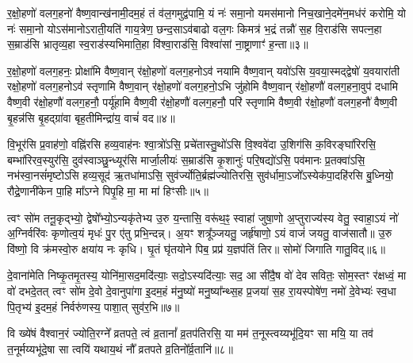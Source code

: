 {\anuvakamend[{द्वेष॑ इ॒मा अ॒ष्टाद॑श च॥१॥}]}

र॒क्षो॒हणो॑ वलग॒हनो॑ वैष्ण॒वान्ख॑नामी॒दम॒हं तं व॑ल॒गमुद्व॑पामि॒ यं नः॑ समा॒नो यमस॑मानो निच॒खाने॒दमे॑न॒मध॑रं करोमि॒ यो नः॑ समा॒नो यो\-ऽस॑मानो\-ऽराती॒यति॑ गाय॒त्रेण॒ छन्द॒सा\-ऽव॑बाढो वल॒गः किमत्र॑ भ॒द्रं तन्नौ॑ स॒ह वि॒राड॑सि सपत्न॒हा स॒म्राड॑सि भ्रातृव्य॒हा स्व॒राड॑स्यभिमाति॒हा वि॑श्वा॒राड॑सि॒ विश्वा॑सां ना॒ष्ट्राणाꣳ॑ ह॒न्ता॥३॥

र॒क्षो॒हणो॑ वलग॒हनः॒ प्रोक्षा॑मि वैष्ण॒वान् र॑क्षो॒हणो॑ वलग॒हनो\-ऽव॑ नयामि वैष्ण॒वान् यवो॑\-ऽसि य॒वया॒स्मद्द्वेषो॑ य॒वयारा॑ती रक्षो॒हणो॑ वलग॒हनो\-ऽव॑ स्तृणामि वैष्ण॒वान् र॑क्षो॒हणो॑ वलग॒हनो॒\-ऽभि जु॑होमि वैष्ण॒वान् र॑क्षो॒हणौ॑ वलग॒हना॒वुप॑ दधामि वैष्ण॒वी र॑क्षो॒हणौ॑ वलग॒हनौ॒ पर्यू॑हामि वैष्ण॒वी र॑क्षो॒हणौ॑ वलग॒हनौ॒ परि॑ स्तृणामि वैष्ण॒वी र॑क्षो॒हणौ॑ वलग॒हनौ॑ वैष्ण॒वी बृ॒हन्न॑सि बृ॒हद्ग्रा॑वा बृह॒तीमिन्द्रा॑य॒ वाचं॑ वद॥४॥

{\anuvakamend[{ह॒न्तेन्द्रा॑य॒ द्वे च॑॥२॥}]}

वि॒भूर॑सि प्र॒वाह॑णो॒ वह्नि॑रसि हव्य॒वाह॑नः श्वा॒त्रो॑\-ऽसि॒ प्रचे॑तास्तु॒थो॑\-ऽसि वि॒श्ववे॑दा उ॒शिग॑सि क॒विरङ्घा॑रिरसि॒ बम्भा॑रिरव॒स्युर॑सि॒ दुव॑स्वाञ्छु॒न्ध्यूर॑सि मार्जा॒लीयः॑ स॒म्राड॑सि कृ॒शानुः॑ परि॒षद्यो॑\-ऽसि॒ पव॑मानः प्र॒तक्वा॑\-ऽसि॒ नभ॑स्वा॒नसं॑मृष्टो\-ऽसि हव्य॒सूद॑ ऋ॒तधा॑मा\-ऽसि॒ सुव॑र्ज्योति॒र्ब्रह्म॑ज्योतिरसि॒ सुव॑र्धामा॒\-ऽजो᳚\-ऽस्येक॑पा॒दहि॑रसि बु॒ध्नियो॒ रौद्रे॒णानी॑केन पा॒हि मा᳚\-ऽग्ने पिपृ॒हि मा॒ मा मा॑ हिꣳसीः॥५॥

{\anuvakamend[{अनी॑केना॒ष्टौ च॑॥३॥}]}

त्वꣳ सो॑म तनू॒कृद्भ्यो॒ द्वेषो᳚भ्यो॒\-ऽन्यकृ॑तेभ्य उ॒रु य॒न्तासि॒ वरू॑थ॒ꣴ॒ स्वाहा॑ जुषा॒णो अ॒प्तुराज्य॑स्य वेतु॒ स्वाहा॒\-ऽयं नो॑ अ॒ग्निर्वरि॑वः कृणोत्व॒यं मृधः॑ पु॒र ए॑तु प्रभि॒न्दन्न्। अ॒यꣳ शत्रू᳚ञ्जयतु॒ जर्हृ॑षाणो॒ \-ऽयं वाजं॑ जयतु॒ वाज॑सातौ॥ उ॒रु वि॑ष्णो॒ वि क्र॑मस्वो॒रु क्षया॑य नः कृधि। घृ॒तं घृ॑तयोने पिब॒ प्रप्र॑ य॒ज्ञप॑तिं तिर॥ सोमो॑ जिगाति गातु॒विद्॥६॥

दे॒वाना॑मेति निष्कृ॒तमृ॒तस्य॒ योनि॑मा॒सद॒मदि॑त्याः॒ सदो॒\-ऽस्यदि॑त्याः॒ सद॒ आ सी॑दै॒ष वो॑ देव सवितः॒ सोम॒स्तꣳ र॑क्षध्वं॒ मा वो॑ दभदे॒तत् त्वꣳ सो॑म दे॒वो दे॒वानुपा॑गा इ॒दम॒हं म॑नु॒ष्यो॑ मनु॒ष्या᳚न्थ्स॒ह प्र॒जया॑ स॒ह रा॒यस्पोषे॑ण॒ नमो॑ दे॒वेभ्यः॑ स्व॒धा पि॒तृभ्य॑ इ॒दम॒हं निर्वरु॑णस्य॒ पाशा॒त् सुव॑र॒भि॥७॥

वि ख्ये॑षं वैश्वान॒रं ज्योति॒रग्ने᳚ व्रतपते॒ त्वं व्र॒तानां᳚ व्र॒तप॑तिरसि॒ या मम॑ त॒नूस्त्वय्यभू॑दि॒यꣳ सा मयि॒ या तव॑ त॒नूर्मय्यभू॑दे॒षा सा त्वयि॑ यथाय॒थं नौ᳚ व्रतपते व्र॒तिनो᳚र्व्र॒तानि॑॥८॥

